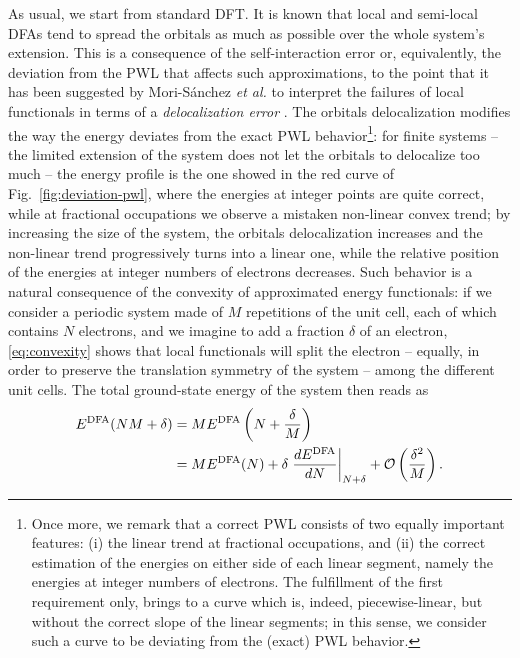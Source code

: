 As usual, we start from standard DFT. It is known that local and semi-local DFAs tend to spread the orbitals as much as possible over the whole system's extension. This is a consequence of the self-interaction error or, equivalently, the deviation from the PWL that affects such approximations, to the point that it has been suggested by Mori-S\'{a}nchez \emph{et al.} to interpret the failures of local functionals in terms of a \emph{delocalization error} \cite{mori-sanchez_localization_2008}. The orbitals delocalization modifies the way the energy deviates from the exact PWL behavior\footnote{Once more, we remark that a correct PWL consists of two equally important features: (i) the linear trend at fractional occupations, and (ii) the correct estimation of the energies on either side of each linear segment, namely the energies at integer numbers of electrons. The fulfillment of the first requirement only, brings to a curve which is, indeed, piecewise-linear, but without the correct slope of the linear segments; in this sense, we consider such a curve to be deviating from the (exact) PWL behavior.}: for finite systems -- the limited extension of the system does not let the orbitals to delocalize too much -- the energy profile is the one showed in the red curve of Fig.~\ref{fig:deviation-pwl}, where the energies at integer points are quite correct, while at fractional occupations we observe a mistaken non-linear convex trend; by increasing the size of the system, the orbitals delocalization increases and the non-linear trend progressively turns into a linear one, while the relative position of the energies at integer numbers of electrons decreases. Such behavior is a natural consequence of the convexity of approximated energy functionals: if we consider a periodic system made of $M$ repetitions of the unit cell, each of which contains $N$ electrons, and we imagine to add a fraction $\delta$ of an electron, \cref{eq:convexity} shows that local functionals will split the electron -- equally, in order to preserve the translation symmetry of the system -- among the different unit cells. The total ground-state energy of the system then reads as \cite{mori-sanchez_localization_2008}
%
\begin{equation}
    \begin{split}
    E^{\rm DFA}(NM + \delta) &= M E^{\rm DFA}\left( N + \frac{\delta}{M} \right) \\
    &= ME^{\rm DFA}(N) + \delta \left. \frac{dE^{\rm DFA}}{dN} \right|_{N+\delta} + \mathcal{O} \left( \frac{\delta^2}{M} \right) .
    \end{split}
    \label{eq:pwl-convex-to-linear}
\end{equation}
